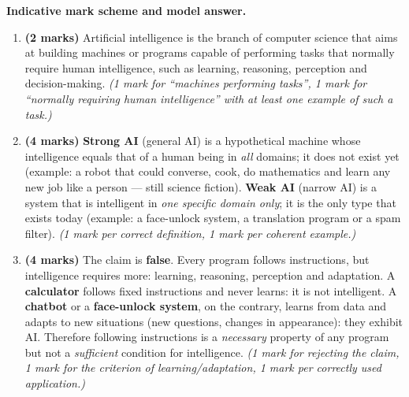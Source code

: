 \documentclass[11pt]{article}
\begin{document}
\begin{corrige}
\textbf{Indicative mark scheme and model answer.}
\begin{enumerate}
\item \textbf{(2 marks)} Artificial intelligence is the branch of computer science that aims at building machines or programs capable of performing tasks that normally require human intelligence, such as learning, reasoning, perception and decision-making. \emph{(1 mark for ``machines performing tasks'', 1 mark for ``normally requiring human intelligence'' with at least one example of such a task.)}
\item \textbf{(4 marks)} \textbf{Strong AI} (general AI) is a hypothetical machine whose intelligence equals that of a human being in \emph{all} domains; it does not exist yet (example: a robot that could converse, cook, do mathematics and learn any new job like a person — still science fiction). \textbf{Weak AI} (narrow AI) is a system that is intelligent in \emph{one specific domain only}; it is the only type that exists today (example: a face-unlock system, a translation program or a spam filter). \emph{(1 mark per correct definition, 1 mark per coherent example.)}
\item \textbf{(4 marks)} The claim is \textbf{false}. Every program follows instructions, but intelligence requires more: learning, reasoning, perception and adaptation. A \textbf{calculator} follows fixed instructions and never learns: it is not intelligent. A \textbf{chatbot} or a \textbf{face-unlock system}, on the contrary, learns from data and adapts to new situations (new questions, changes in appearance): they exhibit AI. Therefore following instructions is a \emph{necessary} property of any program but not a \emph{sufficient} condition for intelligence. \emph{(1 mark for rejecting the claim, 1 mark for the criterion of learning/adaptation, 1 mark per correctly used application.)}
\end{enumerate}
\end{corrige}
\end{document}

